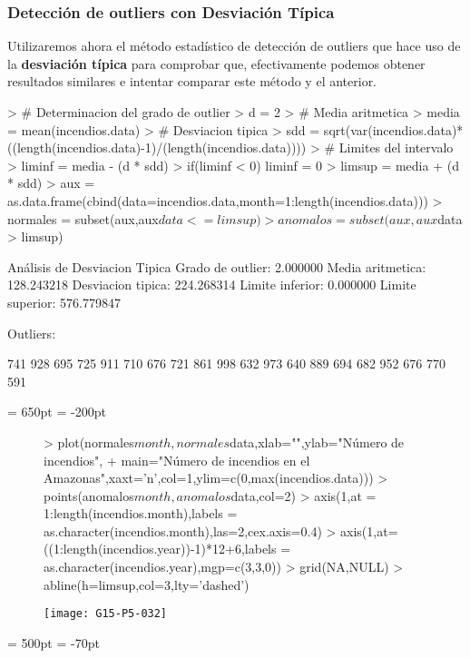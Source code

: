 \documentclass [a4paper] {article}
\begin{document}
\subsubsection{Detección de outliers con Desviación Típica}
Utilizaremos ahora el método estadístico de detección de outliers que hace uso de la \textbf{desviación típica}
para comprobar que, efectivamente podemos obtener resultados similares e intentar comparar este método
y el anterior.

\begin{Schunk}
\begin{Sinput}
> # Determinacion del grado de outlier
> d = 2
> # Media aritmetica
> media = mean(incendios.data)
> # Desviacion tipica
> sdd = sqrt(var(incendios.data)*((length(incendios.data)-1)/(length(incendios.data))))
> # Limites del intervalo
> liminf = media - (d * sdd)
> if(liminf < 0) liminf = 0
> limsup = media + (d * sdd)
> aux = as.data.frame(cbind(data=incendios.data,month=1:length(incendios.data)))
> normales = subset(aux,aux$data <= limsup)
> anomalos = subset(aux,aux$data > limsup)
\end{Sinput}
\end{Schunk}
\begin{Schunk}
\begin{Soutput}
Análisis de Desviacion Tipica
	Grado de outlier: 2.000000
	Media aritmetica: 128.243218
	Desviacion tipica: 224.268314
	Limite inferior: 0.000000
	Limite superior: 576.779847

Outliers:
\end{Soutput}
\begin{Soutput}
741 928 695 725 911 710 676 721 861 998 632 973 640 889 694 682 952 676 770 591
\end{Soutput}
\end{Schunk}

\textwidth = 650pt
\hoffset = -200pt
\begin{figure}[h!]
\centering
\begin{Schunk}
\begin{Sinput}
> plot(normales$month,normales$data,xlab="",ylab="Número de incendios",
+ main="Número de incendios en el Amazonas",xaxt='n',col=1,ylim=c(0,max(incendios.data)))
> points(anomalos$month,anomalos$data,col=2)
> axis(1,at = 1:length(incendios.month),labels = as.character(incendios.month),las=2,cex.axis=0.4)
> axis(1,at=((1:length(incendios.year))-1)*12+6,labels = as.character(incendios.year),mgp=c(3,3,0))
> grid(NA,NULL)
> abline(h=limsup,col=3,lty='dashed')
\end{Sinput}
\end{Schunk}
\texttt{[image: G15-P5-032]}
\end{figure}
\textwidth = 500pt
\hoffset = -70pt
\end{document}
